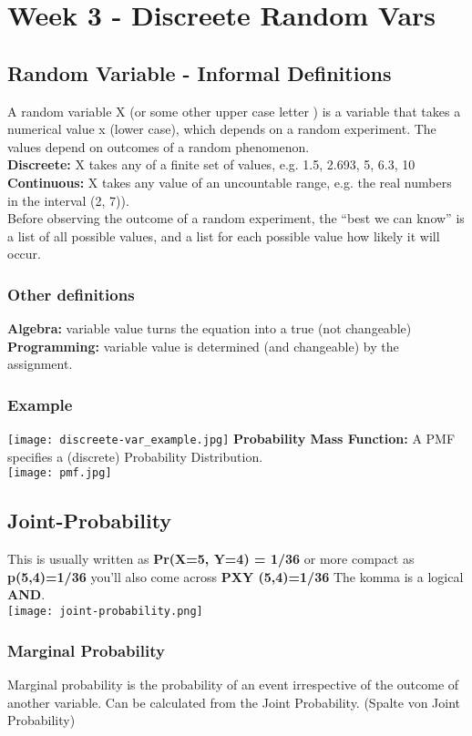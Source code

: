 \section{Week 3 - Discreete Random Vars}
\subsection{Random Variable - Informal Definitions}
A random variable X (or some other upper case letter ) is a variable that takes a numerical value x (lower case), which depends on a random experiment.
The values depend on outcomes of a random phenomenon.\\
\textbf{Discreete:} X takes any of a finite set of values, e.g. {1.5, 2.693, 5, 6.3, 10}\\
\textbf{Continuous:} X takes any value of an uncountable range, e.g. the real numbers in the interval (2, 7)).\\
Before observing the outcome of a random experiment, the ``best we can know'' is a list of all possible values, and a list for each possible value how likely it will occur.
\subsubsection{Other definitions}
\textbf{Algebra:} variable value turns the equation into a true (not changeable)\\
\textbf{Programming:} variable value is determined (and changeable) by the assignment.

\subsubsection{Example}
\texttt{[image: discreete-var\_example.jpg]}
\textbf{Probability Mass Function:}
A PMF specifies a (discrete) Probability Distribution.\\
\texttt{[image: pmf.jpg]}

\subsection{Joint-Probability}
This is usually written as \textbf{Pr(X=5, Y=4) = 1/36} or more compact as \textbf{p(5,4)=1/36} you'll also come across \textbf{PXY (5,4)=1/36}
The komma is a logical \textbf{AND}.\\
\texttt{[image: joint-probability.png]}

\subsubsection{Marginal Probability}
Marginal probability is the probability of an event irrespective of the outcome of another variable.
Can be calculated from the Joint Probability. (Spalte von Joint Probability)

